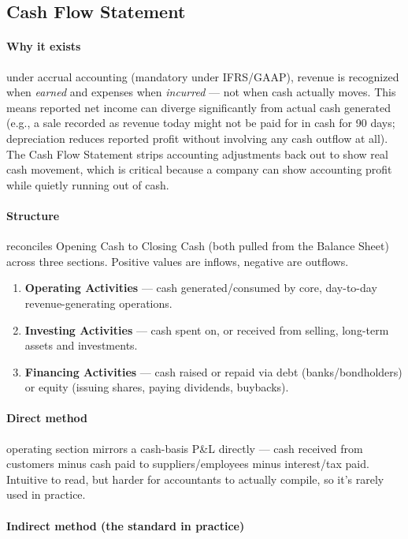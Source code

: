 \documentclass[12pt,openany]{book}
\begin{document}
\subsection{Cash Flow Statement}

\paragraph{Why it exists} under accrual accounting (mandatory under IFRS/GAAP), revenue is recognized when \emph{earned} and expenses when \emph{incurred} --- not when cash actually moves. This means reported net income can diverge significantly from actual cash generated (e.g., a sale recorded as revenue today might not be paid for in cash for 90 days; depreciation reduces reported profit without involving any cash outflow at all). The Cash Flow Statement strips accounting adjustments back out to show real cash movement, which is critical because a company can show accounting profit while quietly running out of cash.

\paragraph{Structure} reconciles Opening Cash to Closing Cash (both pulled from the Balance Sheet) across three sections. Positive values are inflows, negative are outflows.

\begin{enumerate}[leftmargin=*]
    \item \textbf{Operating Activities} --- cash generated/consumed by core, day-to-day revenue-generating operations.
    \item \textbf{Investing Activities} --- cash spent on, or received from selling, long-term assets and investments.
    \item \textbf{Financing Activities} --- cash raised or repaid via debt (banks/bondholders) or equity (issuing shares, paying dividends, buybacks).
\end{enumerate}

\paragraph{Direct method} operating section mirrors a cash-basis P\&L directly --- cash received from customers minus cash paid to suppliers/employees minus interest/tax paid. Intuitive to read, but harder for accountants to actually compile, so it's rarely used in practice.

\paragraph{Indirect method (the standard in practice)} 
\end{document}

